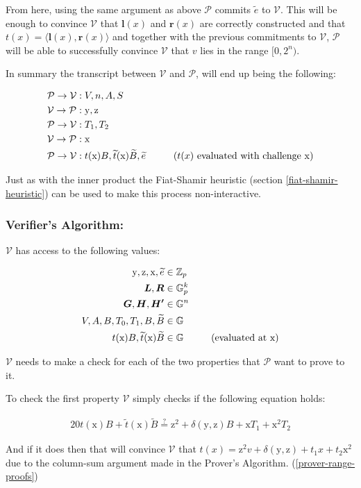\documentclass{article}
\newcommand{\eq}[1]{\begin{alignat*}{20}#1\end{alignat*}}
\newcommand{\eqn}[2]{\begin{equation}\label{#1}\begin{split}#2\end{split}\end{equation}}
\renewcommand{\vec}[1]{\boldsymbol{#1}}
\newcommand{\ran}[1]{\mathrm{#1}}
\newcommand{\V}{\mathcal{V}}
\renewcommand{\P}{\mathcal{P}}
\newcommand{\G}{\mathbb{G}}
\newcommand{\Z}{\mathbb{Z}}
\newcommand{\dotp}[2]{\langle #1, #2 \rangle}
\newcommand{\blind}[1]{\widetilde{#1}}
\newcommand{\bt}{\blind{t}}
\newcommand{\bB}{\blind{B}}
\newcommand{\be}{\blind{e}}
\begin{document}
From here, using the same argument as above $\P$ commits $\be$
to $\V$. This will be enough to convince $\V$ that $\vec{l}(x)$
and $\vec{r}(x)$ are correctly constructed and that $t(x) =
\dotp{\vec{l}(x)}{\vec{r}(x)}$ and together with the previous
commitments to $\V$, $\P$ will be able to successfully convince $\V$
that $v$ lies in the range $[0, 2^n)$.

In summary the transcript between $\V$ and $\P$, will end up being
the following:

\eq{
	\P \rightarrow \V &: V, n, A, S \\
	\V \rightarrow \P &: \ran{y}, \ran{z} \\
	\P \rightarrow \V &: T_1, T_2 \\
	\V \rightarrow \P &: \ran{x} \\
	\P \rightarrow \V &: t(\ran{x})B, \bt(\ran{x})\bB, \be \hspace*{1cm}\text{($t(x)$ evaluated with challenge $\ran{x}$)}\\
}

Just as with the inner product the Fiat-Shamir heuristic
(section \ref{fiat-shamir-heuristic}) can be used to make this process
non-interactive.

\subsubsection{Verifier's Algorithm:} \label{verifier-range-proof}

$\V$ has access to the following values:

\eqn{range-def1-ver}{
	\ran{y}, \ran{z}, \ran{x}, \be &\in \Z_p \\
	\vec{L}, \vec{R} &\in \G_p^{k} \\
	\vec{G}, \vec{H}, \vec{H'} &\in \G^n \\
	V, A, B, T_0, T_1, B, \bB &\in \G \\
	t(\ran{x})B, \bt(\ran{x})\bB &\in \G \hspace*{1cm} \text{(evaluated at x)}
}

$\V$ needs to make a check for each of the two properties that $\P$ want to
prove to it.

To check the first property $\V$ simply checks if the following
equation holds:

\eq{
	t(\ran{x})B + \bt(\ran{x})\bB \stackrel{?}{=} \ran{z^2} + \delta(\ran{y},\ran{z})B + \ran{x}T_1 + \ran{x^2}T_2
}

And if it does then that will convince $\V$ that $t(x) = \ran{z^2}v +
\delta(\ran{y},\ran{z}) + t_1x + t_2\ran{x^2}$ due to the column-sum
argument made in the Prover's Algorithm. (\ref{prover-range-proofs})
\end{document}
